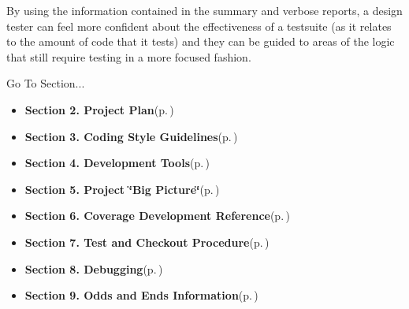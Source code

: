 \begin{Desc}
\item[]By using the information contained in the summary and verbose reports, a design tester can feel more confident about the effectiveness of a testsuite (as it relates to the amount of code that it tests) and they can be guided to areas of the logic that still require testing in a more focused fashion.\end{Desc}




\begin{Desc}
\item[Go To Section...]\begin{itemize}
\item {\bf Section 2.  Project Plan}{\rm (p.\,\pageref{page_project_plan})}\item {\bf Section 3.  Coding Style Guidelines}{\rm (p.\,\pageref{page_code_style})}\item {\bf Section 4.  Development Tools}{\rm (p.\,\pageref{page_tools})}\item {\bf Section 5.  Project \char`\"{}Big Picture\char`\"{}}{\rm (p.\,\pageref{page_big_picture})}\item {\bf Section 6.  Coverage Development Reference}{\rm (p.\,\pageref{page_code_details})}\item {\bf Section 7.  Test and Checkout Procedure}{\rm (p.\,\pageref{page_testing})}\item {\bf Section 8.  Debugging}{\rm (p.\,\pageref{page_debugging})}\item {\bf Section 9.  Odds and Ends Information}{\rm (p.\,\pageref{page_misc})} \end{itemize}
\end{Desc}
